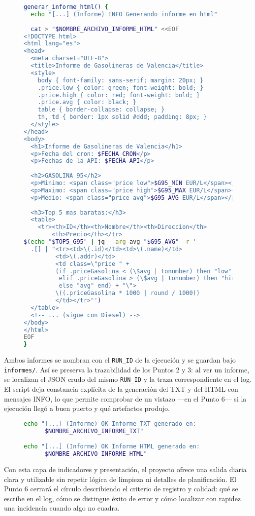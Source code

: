\begin{figure}[H]
  \begin{lstlisting}[language=bash, caption={Figura 5.5 — Generación del informe HTML (extracto)}]
generar_informe_html() {
  echo "[...] (Informe) INFO Generando informe en html"
  
  cat > "$NOMBRE_ARCHIVO_INFORME_HTML" <<EOF
<!DOCTYPE html>
<html lang="es">
<head>
  <meta charset="UTF-8">
  <title>Informe de Gasolineras de Valencia</title>
  <style>
    body { font-family: sans-serif; margin: 20px; }
    .price.low { color: green; font-weight: bold; }
    .price.high { color: red; font-weight: bold; }
    .price.avg { color: black; }
    table { border-collapse: collapse; }
    th, td { border: 1px solid #ddd; padding: 8px; }
  </style>
</head>
<body>
  <h1>Informe de Gasolineras de Valencia</h1>
  <p>Fecha del cron: $FECHA_CRON</p>
  <p>Fechas de la API: $FECHA_API</p>
  
  <h2>GASOLINA 95</h2>
  <p>Minimo: <span class="price low">$G95_MIN EUR/L</span></p>
  <p>Maximo: <span class="price high">$G95_MAX EUR/L</span></p>
  <p>Medio: <span class="price avg">$G95_AVG EUR/L</span></p>
  
  <h3>Top 5 mas baratas:</h3>
  <table>
    <tr><th>ID</th><th>Nombre</th><th>Direccion</th>
        <th>Precio</th></tr>
$(echo "$TOP5_G95" | jq --arg avg "$G95_AVG" -r '
  .[] | "<tr><td>\(.id)</td><td>\(.name)</td>
         <td>\(.addr)</td>
         <td class=\"price " + 
         (if .priceGasolina < (\$avg | tonumber) then "low" 
          elif .priceGasolina > (\$avg | tonumber) then "high" 
          else "avg" end) + "\">
         \((.priceGasolina * 1000 | round / 1000))
         </td></tr>"')
  </table>
  <!-- ... (sigue con Diesel) -->
</body>
</html>
EOF
}
\end{lstlisting}
\end{figure}

Ambos informes se nombran con el \texttt{RUN\_ID} de la ejecución y se guardan bajo \texttt{informes/}. Así se preserva la trazabilidad de los Puntos 2 y 3: al ver un informe, se localizan el JSON crudo del mismo \texttt{RUN\_ID} y la traza correspondiente en el log. El script deja constancia explícita de la generación del TXT y del HTML con mensajes INFO, lo que permite comprobar de un vistazo —en el Punto 6— si la ejecución llegó a buen puerto y qué artefactos produjo.

\begin{figure}[H]
  \begin{lstlisting}[language=bash, caption={Figura 5.6 — Confirmación de informes generados}]
echo "[...] (Informe) OK Informe TXT generado en: 
      $NOMBRE_ARCHIVO_INFORME_TXT"

echo "[...] (Informe) OK Informe HTML generado en: 
      $NOMBRE_ARCHIVO_INFORME_HTML"
\end{lstlisting}
\end{figure}

Con esta capa de indicadores y presentación, el proyecto ofrece una salida diaria clara y utilizable sin repetir lógica de limpieza ni detalles de planificación. El Punto 6 cerrará el círculo describiendo el criterio de registro y calidad: qué se escribe en el log, cómo se distingue éxito de error y cómo localizar con rapidez una incidencia cuando algo no cuadra.

